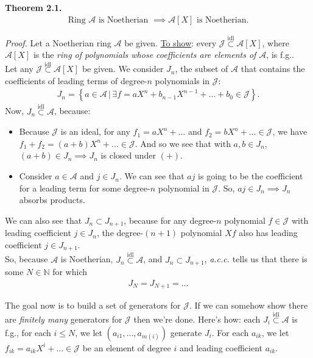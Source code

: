 \documentclass[12pt]{article}
\newcommand{\lc}{\left\{}
\newcommand{\rc}{\right\}}
\begin{document}
\textbf{Theorem 2.1.}
	\begin{align*}
	\boxed{\text{Ring } \mathcal{A} \text{ is Noetherian } \implies \mathcal{A}[X] \text{ is Noetherian.}}
	\end{align*}

\noindent \textit{Proof.} 
	Let a Noetherian ring $\mathcal{A}$ be given. \underline{To show}: every $\mathcal{J} \overset{\text{idl}}{\subset}\mathcal{A}[X]$, where $\mathcal{A}[X]$ is the \textit{ring of polynomials whose coefficients are elements of $\mathcal{A}$}, is f.g..\\
	
	\noindent Let any $\mathcal{J} \overset{\text{idl}}{\subset} \mathcal{A}[X]$ be given. We consider $J_n$, the subset of $\mathcal{A}$ that contains the coefficients of leading terms of degree-$n$ polynomials in $\mathcal{J}$:
	\begin{align*}
	J_n = \lc a \in \mathcal{A}\, \vert\, \exists f = aX^n + b_{n-1}X^{n-1} + \dots + b_0 \in \mathcal{J} \rc.
	\end{align*} 
	\noindent Now, $J_n \overset{\text{idl}}{\subset}\mathcal{A}$, because:
	\begin{itemize}
		\item Because $\mathcal{J}$ is an ideal, for any $f_1 = aX^{n} + \dots$ and  $f_2 = bX^{n} + \dots \in \mathcal{J}$, we have $f_1 + f_2 = (a+b)X^{n}+ \dots \in \mathcal{J}$. And so we see that with $a,b\in J_n$, $(a+b)\in J_n \implies J_n$ is closed under $(+)$.
		\item Consider $a\in \mathcal{A}$ and $j \in J_n$. We can see that $aj$ is going to be the coefficient for a leading term for some degree-$n$ polynomial in $\mathcal{J}$. So, $aj \in J_n \implies J_n$ absorbs products.  
	\end{itemize}

	\noindent We can also see that $J_n \subset J_{n+1}$, because for any degree-$n$ polynomial $f \in \mathcal{J}$ with leading coefficient $j \in J_n$, the degree-$(n+1)$ polynomial $Xf$ also has leading coefficient $j \in J_{n+1}$. \\
	
	\noindent So, because $\mathcal{A}$ is Noetherian, $J_n \overset{\text{idl}}{\subset} \mathcal{A}$, and $J_n \subset J_{n+1}$, \textit{a.c.c.} tells us that there is some $N \in \mathbb{N}$ for which
	\begin{align*}
	J_N = J_{N+1} = \dots
	\end{align*} 
	
	\noindent The goal now is to build a set of generators for $\mathcal{J}$. If we can somehow show there are \textit{finitely many} generators for $\mathcal{J}$ then we're done. Here's how: each $J_i \overset{\text{idl}}{\subset} \mathcal{A}$ is f.g., for each $i\leq N$, we let $(a_{i1}, \dots, a_{m(i)})$ generate $J_i$. For each $a_{ik}$, we let $f_{ik} = a_{ik}X^i + \dots \in \mathcal{J}$ be an element of degree $i$ and leading coefficient $a_{ik}$. \\
	
\end{document}

